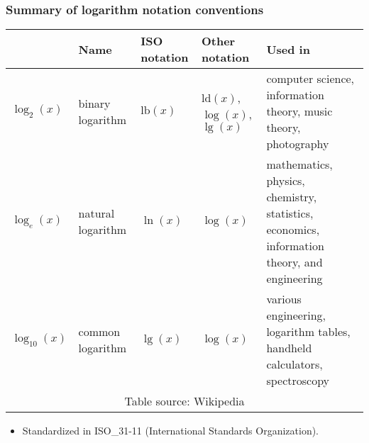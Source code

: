 \begin{frame}
\frametitle{Summary of logarithm notation conventions}
\small 
\begin{tabular}{|@{}m{1.1cm}|@{}|m{1.5cm}@{}|m{1cm}@{}|m{2cm}@{}|m{5cm}|}\hline
& Name& ISO notation& Other notation& Used in\\\hline
$\log_2(x)$&binary logarithm& $\text{lb}(x)$&$\text{ld}(x)$, $\log(x)$, $\lg(x)$& computer science, information theory, music theory, photography\\\hline
$\log_e(x)$& natural logarithm& $\ln (x)$& $\log(x)$&
mathematics, physics, chemistry,
statistics, economics, information theory, and engineering
\\\hline
$\log_{10}(x)$&common logarithm&$\lg(x)$& $\log(x)$&various engineering, logarithm tables, handheld calculators, spectroscopy\\\hline
\multicolumn{5}{c}{Table source: Wikipedia}
\end{tabular}
\begin{itemize}
\item Standardized in ISO\_31-11 (International Standards Organization).
\end{itemize}
\end{frame}

